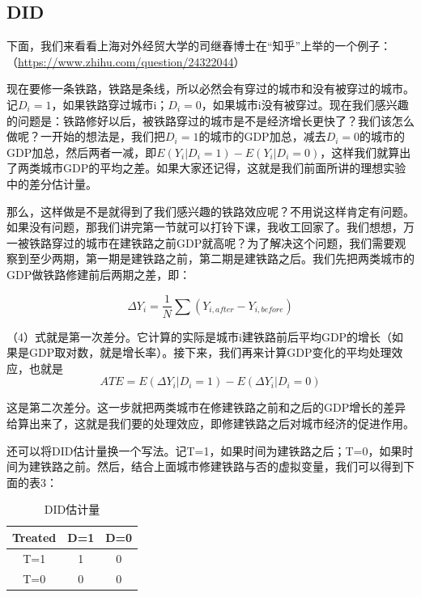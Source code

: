\documentclass[cn,12pt,math=newtx,citestyle=gb7714-2015,bibstyle=gb7714-2015]{elegantbook}
\begin{document}
	\subsection{DID}
	
	下面，我们来看看上海对外经贸大学的司继春博士在“知乎”上举的一个例子：（\url{https://www.zhihu.com/question/24322044}）
	
	现在要修一条铁路，铁路是条线，所以必然会有穿过的城市和没有被穿过的城市。记$D_i=1$，如果铁路穿过城市i；$D_i=0$，如果城市i没有被穿过。现在我们感兴趣的问题是：铁路修好以后，被铁路穿过的城市是不是经济增长更快了？我们该怎么做呢？一开始的想法是，我们把$D_i=1$的城市的GDP加总，减去$D_i=0$的城市的GDP加总，然后两者一减，即$E(Y_i\big|D_i=1)-E(Y_i\big|D_i=0)$，这样我们就算出了两类城市GDP的平均之差。如果大家还记得，这就是我们前面所讲的理想实验中的差分估计量。
	
	那么，这样做是不是就得到了我们感兴趣的铁路效应呢？不用说这样肯定有问题。如果没有问题，那我们讲完第一节就可以打铃下课，我收工回家了。我们想想，万一被铁路穿过的城市在建铁路之前GDP就高呢？为了解决这个问题，我们需要观察到至少两期，第一期是建铁路之前，第二期是建铁路之后。我们先把两类城市的GDP做铁路修建前后两期之差，即：
	
	\begin{equation}
		\Delta{Y}_i=\frac{1}{N}\sum{(Y_{i,after}-Y_{i,before})}
	\end{equation}
	
	（4）式就是第一次差分。它计算的实际是城市i建铁路前后平均GDP的增长（如果是GDP取对数，就是增长率）。接下来，我们再来计算GDP变化的平均处理效应，也就是
	\begin{equation}
		ATE=E(\Delta{Y}_i\big|D_i=1)-E(\Delta{Y}_i\big|D_i=0)
	\end{equation}
	
	这是第二次差分。这一步就把两类城市在修建铁路之前和之后的GDP增长的差异给算出来了，这就是我们要的处理效应，即修建铁路之后对城市经济的促进作用。
	
	还可以将DID估计量换一个写法。记T=1，如果时间为建铁路之后；T=0，如果时间为建铁路之前。然后，结合上面城市修建铁路与否的虚拟变量，我们可以得到下面的表3：
	
	\begin{center}
		\begin{table}[!h]
			\caption{DID估计量}\label{tab:digit}
			\begin{center}
				\begin{tabular}{|c|c|c|}
					\hline
					Treated&D=1&D=0\\
					\hline
					T=1&1&0\\
					\hline
					T=0&0&0\\
					\hline
				\end{tabular}
			\end{center}
		\end{table}
	\end{center}
	
\end{document}
